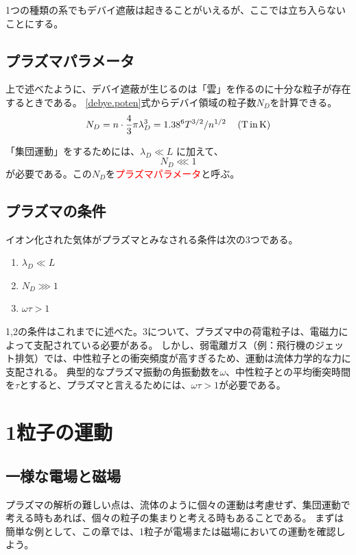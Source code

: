 \documentclass{ltjsarticle}
\numberwithin{equation}{section} %
\begin{document}
1つの種類の系でもデバイ遮蔽は起きることがいえるが、ここでは立ち入らないことにする。

\subsection{プラズマパラメータ}
上で述べたように、デバイ遮蔽が生じるのは「雲」を作るのに十分な粒子が存在するときである。
\eqref{debye.poten}式からデバイ領域の粒子数$N_D$を計算できる。
\begin{equation}
  N_D = n\cdot \frac{4}{3}\pi \lambda_D ^3 = 1.38 \time 10^6T^{3/2}/n^{1/2} \hspace{1pc}(\text{T}\, \text{in}\, \si{\kelvin})
\end{equation}

「集団運動」をするためには、$\lambda_D \ll L$ に加えて、
\begin{equation}
  N_D \lll 1
\end{equation}
が必要である。この$N_D$を\textcolor{red}{プラズマパラメータ}と呼ぶ。

\subsection{プラズマの条件}
イオン化された気体がプラズマとみなされる条件は次の3つである。
\begin{enumerate}
  \item $\lambda_D \ll L$
  \item $N_D \ggg 1$
  \item $\omega \tau > 1$
\end{enumerate}
1,2の条件はこれまでに述べた。3について、プラズマ中の荷電粒子は、電磁力によって支配されている必要がある。
しかし、弱電離ガス（例：飛行機のジェット排気）では、中性粒子との衝突頻度が高すぎるため、運動は流体力学的な力に支配される。
典型的なプラズマ振動の角振動数を$\omega$、中性粒子との平均衝突時間を$\tau$とすると、プラズマと言えるためには、$\omega \tau > 1$が必要である。

\section{1粒子の運動}
\subsection{一様な電場と磁場}
プラズマの解析の難しい点は、流体のように個々の運動は考慮せず、集団運動で考える時もあれば、個々の粒子の集まりと考える時もあることである。
まずは簡単な例として、この章では、1粒子が電場または磁場においての運動を確認しよう。
\end{document}
